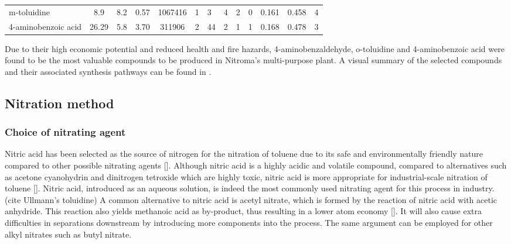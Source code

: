 \begin{table}[H]
\begin{tabularx}{\linewidth}{l|S[table-format=4.2]S[table-format=1.1]XS[table-format=7.0,round-mode=figures,round-precision=2]|XX|lll|S[table-format=1.3]S[table-format=1.3]c}
m-toluidine         & 8.9           & 8.2 & 0.57                           & 1067416              & 1                   & 3                       & 4      & 2            & 0           & 0.161                 & 0.458                    & 4                         \\ 
4-aminobenzoic acid & 26.29         & 5.8 & 3.70                           & 311906               & 2                 & 44                       & 2      & 1            & 1           & 0.168                 & 0.478                    & 3 \\ \bottomrule
\end{tabularx}
\end{table}

Due to their high economic potential and reduced health and fire hazards, 4-aminobenzaldehyde, o-toluidine and 4-aminobenzoic acid were found to be the most valuable compounds to be produced in Nitroma's multi-purpose plant.  A visual summary of the selected compounds and their associated synthesis pathways can be found in .



\subsection{Nitration method}
\subsubsection{Choice of nitrating agent}
Nitric acid has been selected as the source of nitrogen for the nitration of toluene due to its safe and environmentally friendly nature compared to other possible nitrating agents []. Although nitric acid is a highly acidic and volatile compound, compared to alternatives such as acetone cyanohydrin and dinitrogen tetroxide which are highly toxic, nitric acid is more appropriate for industrial-scale nitration of toluene []. Nitric acid, introduced as an aqueous solution, is indeed the most commonly used nitrating agent for this process in industry. (cite Ullmann's toluidine) A common alternative to nitric acid is acetyl nitrate, which is formed by the reaction of nitric acid with acetic anhydride. This reaction also yields methanoic acid as by-product, thus resulting in a lower atom economy []. It will also cause extra difficulties in separations downstream by introducing more components into the process. The same argument can be employed for other alkyl nitrates such as butyl nitrate. 



